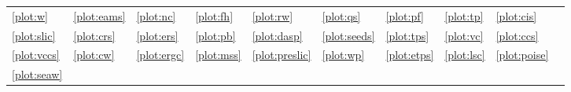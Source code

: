 	{\scriptsize
		\begin{tabularx}{\textwidth}{X X X X X X X X X l}
			\ref{plot:w} \W &
			\ref{plot:eams} \EAMS &
			\ref{plot:nc} \NC &
			\ref{plot:fh} \FH &
			\ref{plot:rw} \RW &
			\ref{plot:qs} \QS &
			\ref{plot:pf} \PF &
			\ref{plot:tp} \TP &
			\ref{plot:cis} \CIS \\
			\ref{plot:slic} \SLIC &
			\ref{plot:crs} \CRS &
			\ref{plot:ers} \ERS &
			\ref{plot:pb} \PB &
			\ref{plot:dasp} \DASP &
			\ref{plot:seeds} \SEEDS &
			\ref{plot:tps} \TPS &
			\ref{plot:vc} \VC &
			\ref{plot:ccs} \CCS \\
			\ref{plot:vccs} \VCCS &
			\ref{plot:cw} \CW &
			\ref{plot:ergc} \ERGC &
			\ref{plot:mss} \MSS &
			\ref{plot:preslic} \preSLIC &
			\ref{plot:wp} \WP &
			\ref{plot:etps} \ETPS &
			\ref{plot:lsc} \LSC &
			\ref{plot:poise} \POISE \\
			\ref{plot:seaw} \SEAW & & & & & & & &
		\end{tabularx}
	}
